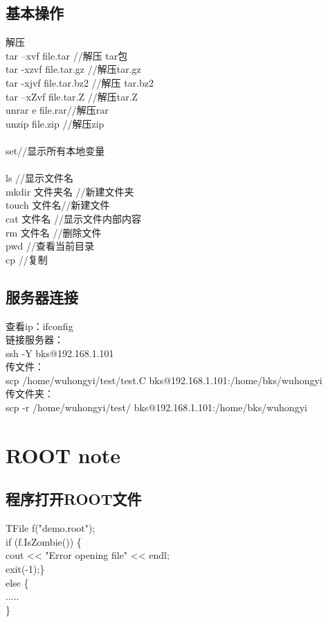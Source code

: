\documentclass[11pt,a4paper,titlepage]{article}
\begin{document}
\subsection{\kai 基本操作}
解压\\
tar –xvf file.tar       //解压 tar包\\
tar -xzvf file.tar.gz   //解压tar.gz\\
tar -xjvf file.tar.bz2  //解压 tar.bz2\\
tar –xZvf file.tar.Z    //解压tar.Z\\
unrar e file.rar//解压rar\\
unzip file.zip  //解压zip\\
\\
set//显示所有本地变量\\ 
\\
ls //显示文件名\\
mkdir 文件夹名       //新建文件夹\\       
touch 文件名//新建文件\\
cat 文件名  //显示文件内部内容\\
rm 文件名   //删除文件\\
pwd       //查看当前目录\\
cp         //复制\\

\subsection{\kai 服务器连接}
查看ip：ifconfig\\
链接服务器：\\
ssh -Y bks@192.168.1.101\\
传文件：\\
scp /home/wuhongyi/test/test.C bks@192.168.1.101:/home/bks/wuhongyi\\
传文件夹：\\
scp -r /home/wuhongyi/test/ bks@192.168.1.101:/home/bks/wuhongyi\\

\section{ROOT note}
\subsection{\kai 程序打开ROOT文件}
TFile f("demo.root");\\
if (f.IsZombie()) \{\\
cout << "Error opening file" << endl;\\
exit(-1);\} \\
else \{\\
 .....\\
\}\\
\end{document}
